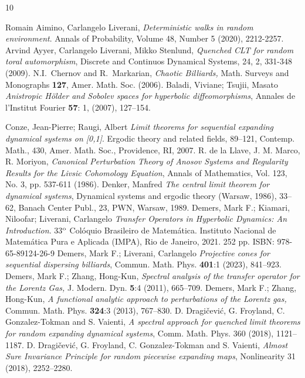 \documentclass{amsart}
\numberwithin{equation}{section}
\begin{document}
\begin{thebibliography}{10}

 Romain Aimino, Carlangelo Liverani, {\em Deterministic walks in random environment}. Annals of Probability, Volume 48, Number 5 (2020), 2212-2257. 
  Arvind Ayyer, Carlangelo Liverani, Mikko Stenlund, {\em Quenched CLT for random toral automorphism},  Discrete and Continuos Dynamical Systems, 24, 2, 331-348 (2009).
  N.I.~Chernov and R.~Markarian, \emph{Chaotic Billiards,}
Math. Surveys and Monographs {\bf 127}, Amer. Math. Soc. (2006).
 Baladi, Viviane; Tsujii, Masato {\em Anistropic H\"older and Sobolev spaces for hyperbolic diffeomorphisms},  Annales de l'Institut Fourier {\bf 57}: 1, (2007), 127--154.

 Conze, Jean-Pierre; Raugi, Albert {\em Limit theorems for sequential expanding dynamical systems on [0,1]}. Ergodic theory and related fields, 89--121, Contemp. Math., 430, Amer. Math. Soc., Providence, RI, 2007.
  R. de la Llave, J. M. Marco, R. Moriyon, {\em Canonical Perturbation Theory of Anosov Systems and Regularity Results for the Livsic Cohomology Equation},
Annals of Mathematics, Vol. 123, No. 3, pp. 537-611 (1986). 
 Denker, Manfred {\em The central limit theorem for dynamical systems}, Dynamical systems and ergodic theory (Warsaw, 1986), 33--62, Banach Center Publ., 23, PWN, Warsaw, 1989.
Demers, Mark F.; Kiamari, Niloofar; Liverani, Carlangelo {\em Transfer Operators in Hyperbolic Dynamics: An Introduction}. 33$^{\mbox{\scriptsize o}}$ Colóquio Brasileiro de Matemática. Instituto Nacional de Matemática Pura e Aplicada (IMPA), Rio de Janeiro, 2021. 252 pp. ISBN: 978-65-89124-26-9
 Demers, Mark F.; Liverani, Carlangelo {\em Projective cones for sequential dispersing billiards}, Commun. Math. Phys. {\bf 401}:1 (2023), 841--923.
 Demers, Mark F.; Zhang, Hong-Kun, {\em Spectral analysis of the transfer operator for the Lorentz Gas,} J. Modern. Dyn. {\bf 5}:4 (2011), 665--709.
 Demers, Mark F.; Zhang, Hong-Kun, {\em A functional analytic approach to
perturbations of the Lorentz gas,} Commun. Math. Phys. {\bf 324}:3 (2013), 767--830. 
 D. Dragičević, G. Froyland, C. Gonzalez-Tokman and S. Vaienti, {\em A spectral approach for quenched limit theorems for random expanding dynamical systems}, Comm. Math. Phys. 360
(2018), 1121–1187.
 D. Dragičević, G. Froyland, C. Gonzalez-Tokman and S. Vaienti, {\em Almost Sure Invariance Principle for random piecewise expanding maps}, Nonlinearity 31 (2018), 2252–2280.

\end{thebibliography}
\end{document}

